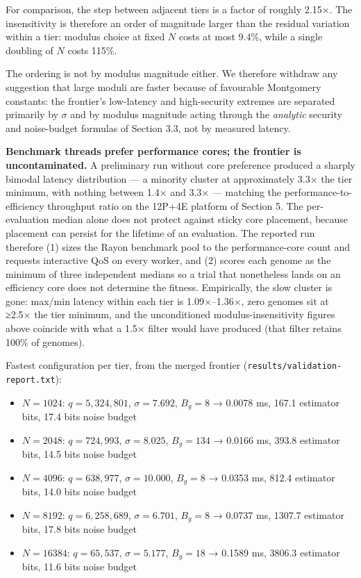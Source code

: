 For comparison, the step between adjacent tiers is a factor of roughly 2.15×. The insensitivity is therefore an order of magnitude larger than the residual variation within a tier: modulus choice at fixed \(N\) costs at most 9.4\%, while a single doubling of \(N\) costs 115\%.

The ordering is not by modulus magnitude either. We therefore withdraw any suggestion that large moduli are faster because of favourable Montgomery constants: the frontier's low-latency and high-security extremes are separated primarily by \(\sigma\) and by modulus magnitude acting through the \emph{analytic} security and noise-budget formulas of Section 3.3, not by measured latency.

\textbf{Benchmark threads prefer performance cores; the frontier is uncontaminated.} A preliminary run without core preference produced a sharply bimodal latency distribution --- a minority cluster at approximately 3.3× the tier minimum, with nothing between 1.4× and 3.3× --- matching the performance-to-efficiency throughput ratio on the 12P+4E platform of Section 5. The per-evaluation median alone does not protect against sticky core placement, because placement can persist for the lifetime of an evaluation. The reported run therefore (1) sizes the Rayon benchmark pool to the performance-core count and requests interactive QoS on every worker, and (2) scores each genome as the minimum of three independent medians so a trial that nonetheless lands on an efficiency core does not determine the fitness. Empirically, the slow cluster is gone: max/min latency within each tier is 1.09×--1.36×, zero genomes sit at ≥2.5× the tier minimum, and the unconditioned modulus-insensitivity figures above coincide with what a 1.5× filter would have produced (that filter retains 100\% of genomes).

Fastest configuration per tier, from the merged frontier (\texttt{results/validation-report.txt}):

\begin{itemize}
\tightlist
\item
  \(N = 1024\): \(q = 5{,}324{,}801\), \(\sigma = 7.692\), \(B_g = 8\) → 0.0078 ms, 167.1 estimator bits, 17.4 bits noise budget
\item
  \(N = 2048\): \(q = 724{,}993\), \(\sigma = 8.025\), \(B_g = 134\) → 0.0166 ms, 393.8 estimator bits, 14.5 bits noise budget
\item
  \(N = 4096\): \(q = 638{,}977\), \(\sigma = 10.000\), \(B_g = 8\) → 0.0353 ms, 812.4 estimator bits, 14.0 bits noise budget
\item
  \(N = 8192\): \(q = 6{,}258{,}689\), \(\sigma = 6.701\), \(B_g = 8\) → 0.0737 ms, 1307.7 estimator bits, 17.8 bits noise budget
\item
  \(N = 16384\): \(q = 65{,}537\), \(\sigma = 5.177\), \(B_g = 18\) → 0.1589 ms, 3806.3 estimator bits, 11.6 bits noise budget
\end{itemize}

